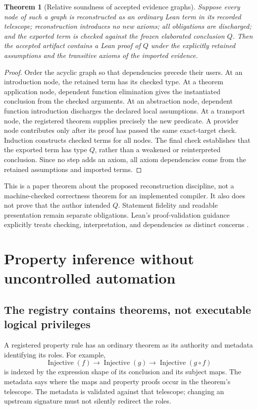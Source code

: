 \documentclass[11pt,letterpaper]{article}
\newtheorem{theorem}[definition]{Theorem}
\theoremstyle{remark}
\begin{document}
\begin{theorem}[Relative soundness of accepted evidence graphs]\label{thm:relative}
Suppose every node of such a graph is reconstructed as an ordinary Lean term
in its recorded telescope; reconstruction introduces no new axioms; all
obligations are discharged; and the exported term is checked against the
frozen elaborated conclusion $Q$. Then the accepted artifact contains a Lean
proof of $Q$ under the explicitly retained assumptions and the transitive
axioms of the imported evidence.
\end{theorem}
\begin{proof}
Order the acyclic graph so that dependencies precede their users. At an
introduction node, the retained term has its checked type. At a theorem
application node, dependent function elimination gives the instantiated
conclusion from the checked arguments. At an abstraction node, dependent
function introduction discharges the declared local assumptions. At a transport
node, the registered theorem supplies precisely the new predicate. A provider
node contributes only after its proof has passed the same exact-target check.
Induction constructs checked terms for all nodes. The final check establishes
that the exported term has type $Q$, rather than a weakened or reinterpreted
conclusion. Since no step adds an axiom, all axiom dependencies come from the
retained assumptions and imported terms.
\end{proof}

This is a paper theorem about the proposed reconstruction discipline, not a
machine-checked correctness theorem for an implemented compiler. It also does
not prove that the author intended $Q$. Statement fidelity and readable
presentation remain separate obligations. Lean's proof-validation guidance
explicitly treats checking, interpretation, and dependencies as distinct
concerns \cite{leanvalidation}.

\section{Property inference without uncontrolled automation}\label{sec:inference}

\subsection{The registry contains theorems, not executable logical privileges}
A registered property rule has an ordinary theorem as its authority and
metadata identifying its roles. For example,
\[
 \operatorname{Injective}(f)\to\operatorname{Injective}(g)
       \to\operatorname{Injective}(g\circ f)
\]
is indexed by the expression shape of its conclusion and its subject maps.
The metadata says where the maps and property proofs occur in the theorem's
telescope. The metadata is validated against that telescope; changing an
upstream signature must not silently redirect the roles.
\end{document}
